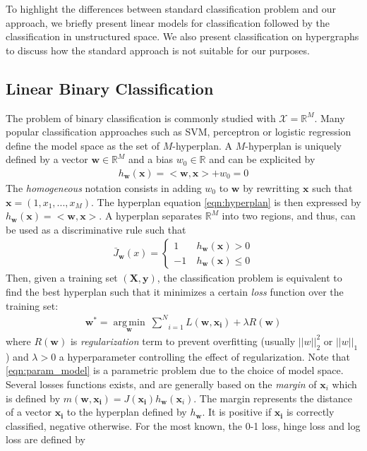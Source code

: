 \documentclass[preprint,12pt]{elsarticle}
\DeclareMathOperator*{\argmin}{arg\,min}
\theoremstyle{definition}
\begin{document}
To highlight the differences between standard classification problem and our approach, we briefly present linear models for classification followed by the classification in unstructured space. We also present classification on hypergraphs to discuss how the standard approach is not suitable for our purposes.

\subsection{Linear Binary Classification}


The problem of binary classification is commonly studied with $\mathcal{X} = \mathbb{R}^{M}$. Many popular classification approaches such as SVM, perceptron or logistic regression define the model space as the set of $M$-hyperplan. A $M$-hyperplan is uniquely defined by a vector $\mathbf{w} \in \mathbb{R}^{M}$ and a bias $w_0 \in \mathbb{R}$ and can be explicited by
\begin{align}
 \label{eqn:hyperplan}
 h_{\mathbf{w}}(\mathbf{x}) = <{\mathbf{w}}, {\mathbf{x}}> + w_0 = 0
\end{align} The {\it homogeneous} notation consists in adding $w_0$ to $\mathbf{w}$ by rewritting $\mathbf{x}$ such that $\mathbf{x} = (1, x_1, ..., x_M)$. The hyperplan equation \eqref{eqn:hyperplan} is then expressed by $h_{\mathbf{w}}(\mathbf{x}) = <{\mathbf{w}}, {\mathbf{x}}>$.
A hyperplan separates $\mathbb{R}^{M}$ into two regions, and thus, can be used as a discriminative rule such that 
\begin{align}
 \bar J_{\mathbf{w}}(x) = \left\{\begin{matrix}
1 & ~h_{\mathbf{w}}(\mathbf{x}) > 0\\ 
-1 & ~h_{\mathbf{w}}(\mathbf{x}) \leq 0
\end{matrix}\right.
\end{align}
Then,  given a training set $(\mathbf{X}, \mathbf{y})$, the classification problem is equivalent to find the best hyperplan such that it minimizes a certain {\it loss} function over the training set:
\begin{align}
 \label{eqn:param_model}
\mathbf{w}^* = \underset{\mathbf{w}}{\argmin} ~ \underset{i=1}{\overset{N}{\sum}} L(\mathbf{w}, \mathbf{x_i}) + \lambda R(\mathbf{w})
\end{align} where $R(\mathbf{w})$ is {\it regularization} term to prevent overfitting (usually $||w||^2_2$ or $||w||_1$) and $\lambda > 0$ a hyperparameter controlling the effect of regularization. Note that \eqref{eqn:param_model} is a parametric problem due to the choice of model space. Several losses functions exists, and are generally based on the {\it margin} of $\mathbf{x}_i$ which is defined by $m(\mathbf{w}, \mathbf{x_i}) = J(\mathbf{x_i}) h_{\mathbf{w}}(\mathbf{x}_i)$. The margin represents the distance of a vector $\mathbf{x_i}$ to the hyperplan defined by $h_{\mathbf{w}}$. It is positive if $\mathbf{x_i}$ is correctly classified, negative otherwise. For the most known, the 0-1 loss, hinge loss and log loss are defined by
\end{document}
